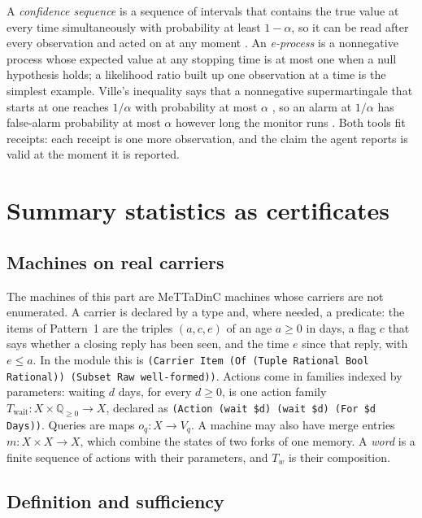 \documentclass[11pt]{article}
\newcommand{\code}[1]{\texttt{#1}}
\newcommand{\Q}{\mathbb{Q}}
\theoremstyle{definition}
\theoremstyle{plain}
\begin{document}
A \emph{confidence sequence} is a sequence of intervals that contains the true value at every time
simultaneously with probability at least $1-\alpha$, so it can be read after every observation and
acted on at any moment \cite{darling,robbins,howard}. An \emph{e-process} is a nonnegative
process whose expected value at any stopping time is at most one when a null hypothesis holds; a
likelihood ratio built up one observation at a time is the simplest example. Ville's inequality
says that a nonnegative supermartingale that starts at one reaches $1/\alpha$ with probability at
most $\alpha$ \cite{ville}, so an alarm at $1/\alpha$ has false-alarm probability at most $\alpha$
however long the monitor runs \cite{ramdas}. Both tools fit receipts: each receipt is one more
observation, and the claim the agent reports is valid at the moment it is reported.
\section{Summary statistics as certificates}\label{sec:theory}

\subsection{Machines on real carriers}\label{sec:machines}

The machines of this part are MeTTaDinC machines whose carriers are not enumerated. A carrier is
declared by a type and, where needed, a predicate: the items of Pattern~1 are the triples
$(a,c,e)$ of an age $a\ge 0$ in days, a flag $c$ that says whether a closing reply has been seen,
and the time $e$ since that reply, with $e\le a$. In the module this is
\code{(Carrier Item (Of (Tuple Rational Bool Rational)) (Subset Raw well-formed))}. Actions come in
families indexed by parameters: waiting $d$ days, for every $d\ge 0$, is one action family
$T_{\mathrm{wait}}\colon X\times\Q_{\ge 0}\to X$, declared as
\code{(Action (wait \$d) (wait \$d) (For \$d Days))}. Queries are maps $o_q\colon X\to V_q$. A
machine may also have merge entries $m\colon X\times X\to X$, which combine the states of two forks
of one memory. A \emph{word} is a finite sequence of actions with their parameters, and $T_w$ is
their composition.

\subsection{Definition and sufficiency}
\end{document}
